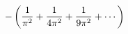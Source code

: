 \documentclass[preview]{standalone}
\begin{document}
\begin{align*}
\special{dvisvgm:raw <g id='unique000'>}-\left(\frac{1}{\pi^2} + \frac{1}{4\pi^2} + \frac{1}{9\pi^2} + \cdots\right)\special{dvisvgm:raw </g>}
\end{align*}
\end{document}
